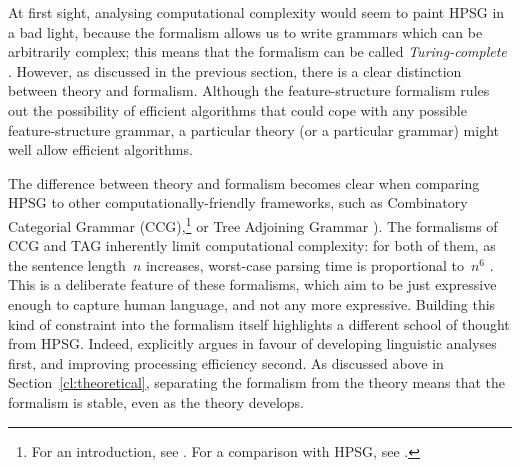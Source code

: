 \documentclass[output=paper]{langsci/langscibook}
\begin{document}
At first sight, analysing computational complexity
would seem to paint HPSG in a bad light,
because the formalism allows us to write grammars
which can be arbitrarily complex;
this means that the formalism can be called \textit{Turing-complete}
\citep[Section~3.4]{Johnson88}.
However, as discussed in the previous section,
there is a clear distinction between theory and formalism.
Although the feature-structure formalism rules out the possibility of efficient algorithms
that could cope with any possible feature-structure grammar,
a particular theory (or a particular grammar) might well allow efficient algorithms.

The difference between theory and formalism
becomes clear when comparing HPSG to other computationally-friendly frameworks,
such as Combinatory Categorial Grammar (CCG),\footnote{%
	For an introduction, see \citet{steedman2011ccg}.
	For a comparison with HPSG, see .
}
or Tree Adjoining Grammar \citep[TAG;][]{Joshi87a-u,SAJ88a-u}).
The formalisms of CCG and TAG inherently limit computational complexity:
for both of them, as the sentence length~$n$ increases,
worst-case parsing time is proportional to~$n^6$ \citep{Kasamietal1989}.
This is a deliberate feature of these formalisms,
which aim to be just expressive enough to capture human language,
and not any more expressive.
Building this kind of constraint into the formalism itself
highlights a different school of thought from HPSG.
Indeed, \citet{MuellerCoreGram} explicitly argues
in favour of developing linguistic analyses first,
and improving processing efficiency second.
As discussed above in Section~\ref{cl:theoretical},
separating the formalism from the theory
means that the formalism is stable, even as the theory develops.
\end{document}
